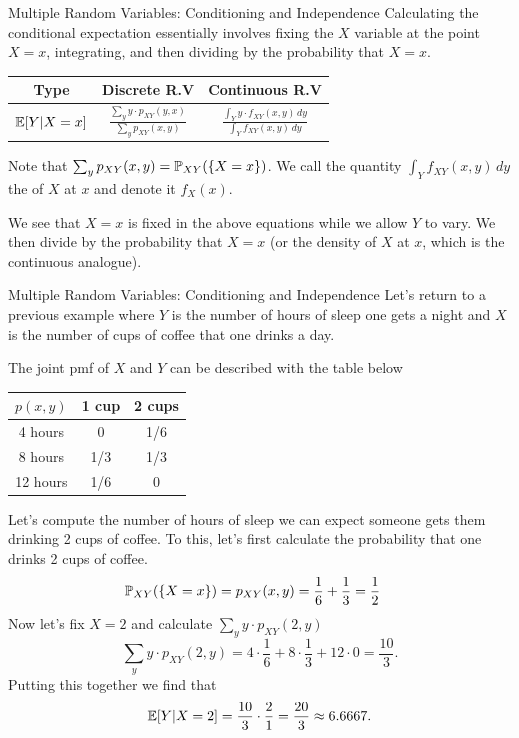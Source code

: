 \documentclass[notheorems,9pt, handout]{beamer}
\begin{document}
\begin{frame}{Multiple Random Variables: Conditioning and Independence} 
	\label{frame:mrv-conditioning-formula}
	Calculating the conditional expectation	essentially involves fixing the \(X\) variable at the point \(X=x\), integrating, and then dividing by the probability that \(X=x\).
	{\large 
		\begin{table}[htpb]
		\renewcommand{\arraystretch}{1.5}
		\centering
		\begin{tabular}{c|cc}
			Type  & Discrete R.V & Continuous R.V \\
			\hline
			\(\E[Y|X=x]\) & \( \frac{\sum_y y\cdot p_{XY}(y,x)}{\sum_y p_{XY}(x,y)}\) & \( \frac{\int_Y y\cdot f_{XY}(x,y)\,dy}{\int_Y f_{XY}(x,y)\,dy}\)
		\end{tabular}
		\end{table}}
	\begin{remark}[]
		Note that \(\sum_y p_{XY}(x,y) = \P_{XY}(\{X=x\})\). We call the quantity \(\int_Y f_{XY}(x,y)\,dy\) the  of \(X\) at \(x\) and denote it \(f_X(x)\).
	\end{remark}
	We see that \(X=x\) is fixed in the above equations while we allow \(Y\) to vary. We then divide by the probability that \(X=x\) (or the density of \(X\) at \(x\), which is the continuous analogue).
	
\end{frame}
\begin{frame}{Multiple Random Variables: Conditioning and Independence} 
	\label{frame:mrv-conditioning-example}
	Let's return to a previous example where \(Y\) is the number of hours of sleep one gets a night and \(X\) is the number of cups of coffee that one drinks a day. 
	
	The joint pmf of \(X\) and \(Y\) can be described with the table below
	\begin{table}[htpb]
		\centering
		\begin{tabular}{c|cc}
			\(p(x,y)\) & 1 cup  & 2 cups\\
			\hline
			4 hours & 0 & 1/6 \\
			8 hours & 1/3 & 1/3 \\
			12 hours & 1/6 & 0
		\end{tabular}
	\end{table}
	Let's compute the number of hours of sleep we can expect someone gets  them drinking 2 cups of coffee. To this, let's first calculate the probability that one drinks 2 cups of coffee.
	\onslide<3->
	\begin{align*}
		\P_{XY}(\{X=x\}) &=p_{XY}(x,y) = \frac{1}{6} + \frac{1}{3} = \frac{1}{2} 
	\end{align*}
	\onslide<4->
	Now let's fix \(X=2\) and calculate \(\sum_y y\cdot p_{XY}(2,y)\)
	\[
		\sum_y y\cdot p_{XY}(2,y) = 4\cdot \frac{1}{6} + 8\cdot\frac{1}{3} + 12\cdot 0 = \frac{10}{3}   
	.\] 
	\onslide<5->
	Putting this together we find that
	\[
		\E[Y|X=2] = \frac{10}{3}\cdot\frac{2}{1} = \frac{20}{3} \approx 6.6667
	.\] 
\end{frame}
\end{document}
